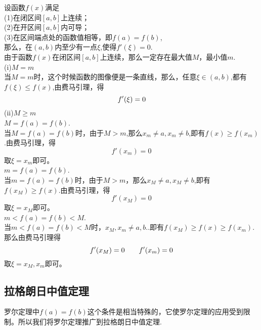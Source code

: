 \sj
\theorem[罗尔(Rolle)定理]
\noindent 设函数$f(x)$满足\\
\kg(1)\enspace 在闭区间$[a,b]$上连续；\\
\kg(2)\enspace 在开区间$[a,b]$内可导；\\
\kg(3)\enspace 在区间端点处的函数值相等，即$f(a)=f(b)$,\\
那么，在$(a,b)$内至少有一点$\xi $,使得$f'(\xi)=0$.\vspace{0.5em}\\
\proof 由于函数$f(x)$在闭区间$[a,b]$上连续，那么一定存在最大值$M$，最小值$m$.
\\ (i)\enspace $M=m$\\
\kg 当$M=m$时，这个时候函数的图像便是一条直线，那么，任意$\xi \in(a,b)$,都有$f(\xi)\leq f(x)$,由费马引理，得
\begin{equation}
\nonumber
f'(\xi)=0\sj
\end{equation}
(ii)\enspace$M\geq m $\\
 $M=f(a)=f(b)$.\\
\kg 当$M=f(a)=f(b)$时，由于$M>m$,那么$x_m\neq a,x_m\neq b$,即有$f(x)\geq f(x_m)$.由费马引理，得
\begin{equation}
	\nonumber
	f'(x_m)=0
\end{equation}
取$\xi=x_m$即可。\\
 $m=f(a)=f(b)$.\\
\kg 当$m=f(a)=f(b)$时，由于$M>m$，那么$x_M\neq a,x_M\neq b$,即有$f(x_M)\geq f(x)$.由费马引理，得
\begin{equation}
	f'(x_M)=0
\end{equation}
取$\xi=x_M$即可。\\
 $m<f(a)=f(b)<M$.\\
\kg 当$m<f(a)=f(b)<M时$，$x_M,x_m\neq a,b.$.即有$f(x_M)\geq f(x)\geq f(x_m)$.那么由费马引理得
\begin{equation}
	f'(x_M)=0\hspace*{2em} f'(x_m)=0
\end{equation}
取$\xi=x_M,x_m$即可。
\subsection{拉格朗日中值定理}
罗尔定理中$f(a)=f(b)$这个条件是相当特殊的，它使罗尔定理的应用受到限制。所以我们将罗尔定理推广到拉格朗日中值定理.\\

\sj
{}

